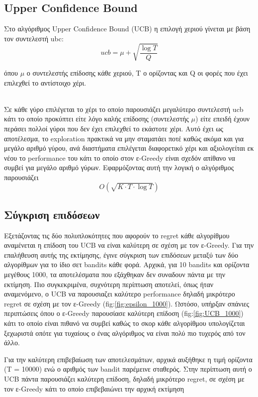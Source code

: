 \subsection*{Upper Confidence Bound}
\noindent
Στο αλγόριθμος Upper Confidence Bound (UCB) η επιλογή χεριού γίνεται με βάση τον συντελεστή ubc:
\begin{equation*}
	ucb = \mu + \sqrt{\frac{\log T}{Q} }
\end{equation*}

όπου $\mu$ ο συντελεστής επίδοσης κάθε χεριού, Τ ο ορίζοντας και Q οι φορές που έχει επιλεχθεί το αντίστοιχο χέρι.

\noindent\\
Σε κάθε γύρο επιλέγεται το χέρι το οποίο παρουσιάζει μεγαλύτερο συντελεστή ucb κάτι το οποίο προκύπτει είτε λόγο καλής επίδοσης (συντελεστής $\mu$) είτε επειδή έχουν περάσει πολλοί γύροι που δεν έχει επιλεχθεί το εκάστοτε χέρι. Αυτό έχει ως αποτέλεσμα, το exploration πρακτικά να μην σταματάει ποτέ καθώς ακόμα και για μεγάλο αριθμό γύρου, ανά διαστήματα επιλέγεται διαφορετικό χέρι και αξιολογείται εκ νέου το performance του κάτι το οποίο στον ε-Greedy είναι σχεδόν απίθανο να συμβεί για μεγάλο αριθμό γύρων. Εφαρμόζοντας αυτή την λογική ο αλγόριθμος παρουσιάζει 
\begin{equation}
	O\left( \sqrt{K \cdot T \cdot \log T}\right)
\end{equation}


\subsection*{Σύγκριση επιδόσεων}
Εξετάζοντας τις δύο πολυπλοκότητες που αφορούν το regret κάθε αλγορίθμου αναμένεται η επίδοση του UCB να είναι καλύτερη σε σχέση με τον ε-Greedy. Για την επαλήθευση αυτής της εκτίμησης, έγινε σύγκριση των επιδόσεων μεταξύ των δύο αλγορίθμων για το ίδιο σετ bandits κάθε φορά. Αρχικά, για 10 bandits και ορίζοντα μεγέθους 1000, τα αποτελέσματα που εξάχθηκαν δεν συναδουν πάντα με την εκτίμηση. Πιο συγκεκριμένα, συχνότερη περίπτωση αποτελεί, όπως ήταν αναμενόμενο, ο UCB να παρουσιαζει καλύτερο performance δηλαδή μικρότερο regret  σε σχέση με τον ε-Greedy (fig:\ref{fig:epsilon_1000}). Ωστόσο, υπήρξαν σπάνιες περιπτώσεις όπου ο ε-Greedy παρουσίασε καλύτερη επίδοση (fig:\ref{fig:UCB_1000}) κάτι το οποίο είναι πιθανό να συμβεί καθώς το σκορ κάθε αλγορίθμου υπολογίζεται ξεχωριστά οπότε για τυχαίους ο ένας αλγόριθμος να είναι πολύ πιο τυχερός από τον άλλο.

\noindent
Για την καλύτερη επιβεβαίωση των αποτελεσμάτων, αρχικά αυξήθηκε η τιμή ορίζοντα (Τ = 10000) ενώ ο αριθμός των bandit παρέμεινε σταθερός. Στην περίπτωση αυτή ο UCB πάντα παρουσιάζει καλύτερη επίδοση, δηλαδή μικρότερο regret, σε σχέση με τον ε-Greedy κάτι το οποίο επιβεβαιώνει την αρχική εκτίμηση 


